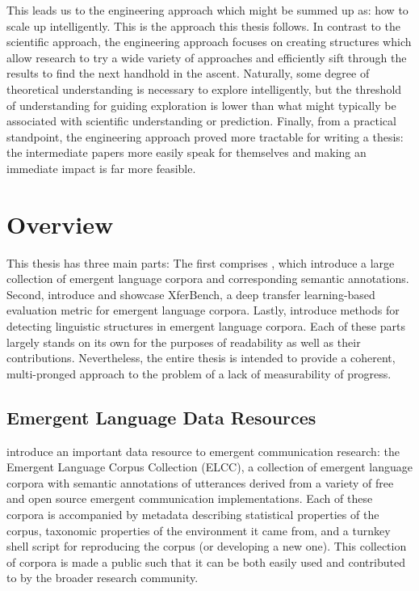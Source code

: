 This leads us to the engineering approach which might be summed up as: how to scale up intelligently.
This is the approach this thesis follows.
In contrast to the scientific approach, the engineering approach focuses on creating structures which allow research to try a wide variety of approaches and efficiently sift through the results to find the next handhold in the ascent.
Naturally, some degree of theoretical understanding is necessary to explore intelligently, but the threshold of understanding for guiding exploration is lower than what might typically be associated with scientific understanding or prediction.
Finally, from a practical standpoint, the engineering approach proved more tractable for writing a thesis: the intermediate papers more easily speak for themselves and making an immediate impact is far more feasible.


\section{Overview}

This thesis has three main parts:
The first comprises , which introduce a large collection of emergent language corpora and corresponding semantic annotations.
Second,  introduce and showcase XferBench, a deep transfer learning-based evaluation metric for emergent language corpora.
Lastly,  introduce methods for detecting linguistic structures in emergent language corpora.
Each of these parts largely stands on its own for the purposes of readability as well as their contributions.
Nevertheless, the entire thesis is intended to provide a coherent, multi-pronged approach to the problem of a lack of measurability of progress.


\subsection{Emergent Language Data Resources}
 introduce an important data resource to emergent communication research: the Emergent Language Corpus Collection (ELCC), a collection of emergent language corpora with semantic annotations of utterances derived from a variety of free and open source emergent communication implementations.
Each of these corpora is accompanied by metadata describing statistical properties of the corpus, taxonomic properties of the environment it came from, and a turnkey shell script for reproducing the corpus (or developing a new one).
This collection of corpora is made a public such that it can be both easily used and contributed to by the broader research community.

